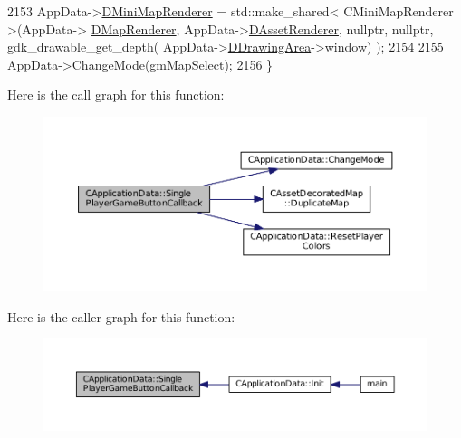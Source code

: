 \begin{DoxyCode}
2153     AppData->\hyperlink{classCApplicationData_a59b0f5dfe30ed5a54dd28aee98109e34}{DMiniMapRenderer} = std::make\_shared< CMiniMapRenderer >(AppData->
      \hyperlink{classCApplicationData_afaf62b458bd7a0ec93ab9f063d7ea8d7}{DMapRenderer}, AppData->\hyperlink{classCApplicationData_a5b42401441ae3a70fb4bd26f5dfdba01}{DAssetRenderer}, \textcolor{keyword}{nullptr}, \textcolor{keyword}{nullptr}, gdk\_drawable\_get\_depth(
      AppData->\hyperlink{classCApplicationData_a4735f5d31632313e0b2a1659eb178987}{DDrawingArea}->window) );
2154     
2155     AppData->\hyperlink{classCApplicationData_aee18c113e9a0acb3cad3d63eb19de71b}{ChangeMode}(\hyperlink{classCApplicationData_ac8ac37a4c8bb871036fbbdc6a072e403a1463619685aa7c9a2b70425303ca99ef}{gmMapSelect});
2156 \}
\end{DoxyCode}
Here is the call graph for this function\+:\nopagebreak
\begin{figure}[H]
\begin{center}
\leavevmode
\includegraphics[width=350pt]{classCApplicationData_a239a28599cbb6762c21306a4a03c6202_cgraph}
\end{center}
\end{figure}
Here is the caller graph for this function\+:\nopagebreak
\begin{figure}[H]
\begin{center}
\leavevmode
\includegraphics[width=350pt]{classCApplicationData_a239a28599cbb6762c21306a4a03c6202_icgraph}
\end{center}
\end{figure}
\hypertarget{classCApplicationData_a7169395ea835eaa9c98188d1b3583534}{}\label{classCApplicationData_a7169395ea835eaa9c98188d1b3583534} 
